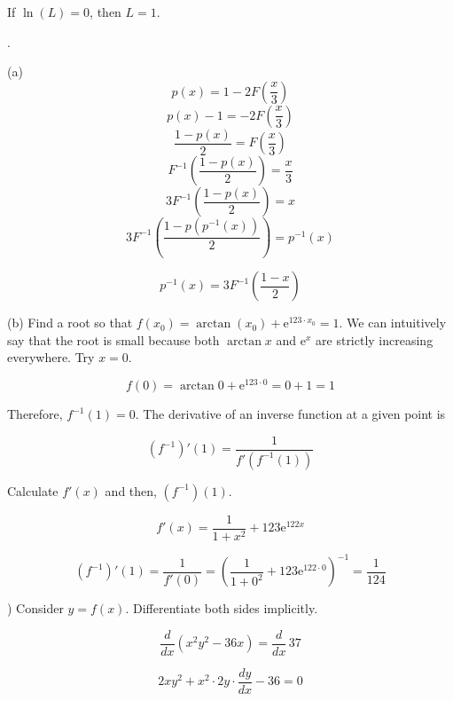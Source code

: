 \documentclass{article}
\begin{document}
\noindent If $\ln(L)=0$, then $\boxed{L=1}$.

\newpage

.

\hfill

\noindent (a) \[p(x)=1-2F\left(\frac x3\right)\]
\[p(x)-1=-2F\left(\frac x3\right)\]
\[\frac{1-p(x)}{2}=F\left(\frac x3\right)\]
\[F^{-1}\left(\frac{1-p(x)}{2}\right)=\frac x3\]
\[3F^{-1}\left(\frac{1-p(x)}{2}\right)=x\]
\[3F^{-1}\left(\frac{1-p\left(p^{-1}(x)\right)}{2}\right)=p^{-1}(x)\]

\[\boxed{p^{-1}(x)=3F^{-1}\left(\frac{1-x}{2}\right)}\]

\hfill

\noindent (b) Find a root so that $f(x_0) = \arctan(x_0)+\mathrm{e}^{123\cdot x_0} = 1$. We can intuitively say that the root is small because both $\arctan x$ and $\mathrm{e}^x$ are strictly increasing everywhere. Try $x=0$.

\begin{equation*}f(0) = \arctan 0 + \mathrm{e}^{123\cdot 0} = 0 + 1 = 1\end{equation*}

\hfill

\noindent Therefore, $f^{-1}(1)=0$. The derivative of an inverse function at a given point is

\begin{equation*}
\left(f^{-1}\right)'(1) = \frac1{f'(f^{-1}(1))}
\end{equation*}

\hfill

\noindent Calculate $f'(x)$ and then, $(f^{-1})(1)$.

\begin{equation*}
    f'(x)=\frac1{1+x^2}+123\mathrm{e}^{122x}
\end{equation*}

\begin{equation*}
    \left(f^{-1}\right)'(1)=\frac{1}{f'(0)}=\left( \frac1{1+0^2}+123\mathrm{e}^{122\cdot0} \right)^{-1}=\boxed{\frac1{124}}
\end{equation*}

\hfill

) Consider $y=f(x)$. Differentiate both sides implicitly.

\begin{equation*}\frac{d}{dx}\left(x^2y^2-36x\right) = \frac{d}{dx}\,37\end{equation*}

\begin{equation*}2xy^2+ x^2\cdot2y\cdot \frac{dy}{dx}-36 = 0\end{equation*}
\end{document}
